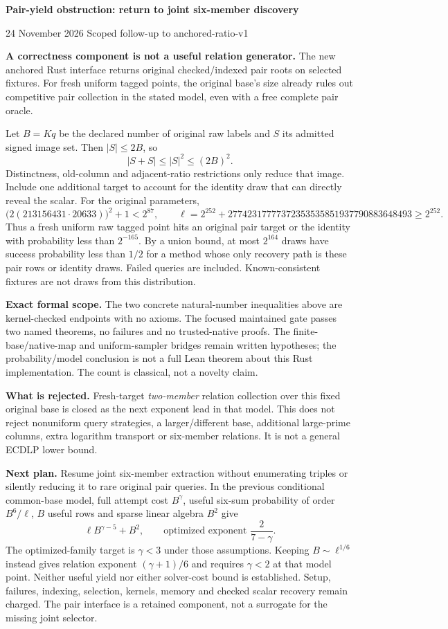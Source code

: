 \documentclass[11pt]{article}
\begin{document}
{\Large\bf Pair-yield obstruction: return to joint six-member discovery}\par
24 November 2026 \hfill Scoped follow-up to anchored-ratio-v1

\textbf{A correctness component is not a useful relation generator.}
The new anchored Rust interface returns original checked/indexed pair roots
on selected fixtures. For fresh uniform tagged points, the original base's
size already rules out competitive pair collection in the stated model,
even with a free complete pair oracle.

Let $B=Kq$ be the declared number of original raw labels and $S$ its admitted
signed image set. Then $|S|\le2B$, so
\[
 |S+S|\le |S|^2\le(2B)^2.
\]
Distinctness, old-column and adjacent-ratio restrictions only reduce that
image. Include one additional target to account for the identity draw that
can directly reveal the scalar. For the original parameters,
\[
 \bigl(2(213156431\cdot20633)\bigr)^2+1<2^{87},\qquad
 \ell=2^{252}+27742317777372353535851937790883648493\ge2^{252}.
\]
Thus a fresh uniform raw tagged point hits an original pair target or the
identity with probability less than $2^{-165}$. By a union bound, at most
$2^{164}$ draws have success probability less than $1/2$ for a method whose
only recovery path is these pair rows or identity draws. Failed queries are
included. Known-consistent fixtures are not draws from this distribution.

\textbf{Exact formal scope.} The two concrete natural-number inequalities
above are kernel-checked endpoints with no axioms. The focused maintained
gate passes two named theorems, no failures and no trusted-native proofs.
The finite-base/native-map and uniform-sampler bridges remain written
hypotheses; the probability/model conclusion is not a full Lean theorem
about this Rust implementation. The count is classical, not a novelty claim.

\textbf{What is rejected.} Fresh-target \emph{two-member} relation collection
over this fixed original base is closed as the next exponent lead in that
model. This does not reject nonuniform query strategies, a larger/different
base, additional large-prime columns, extra logarithm transport or six-member
relations. It is not a general ECDLP lower bound.

\textbf{Next plan.} Resume joint six-member extraction without enumerating
triples or silently reducing it to rare original pair queries. In the
previous conditional common-base model, full attempt cost $B^\gamma$, useful
six-sum probability of order $B^6/\ell$, $B$ useful rows and sparse linear
algebra $B^2$ give
\[
 \ell B^{\gamma-5}+B^2,\qquad
 \text{optimized exponent }\frac{2}{7-\gamma}.
\]
The optimized-family target is $\gamma<3$ under those assumptions. Keeping
$B\sim\ell^{1/6}$ instead gives relation exponent $(\gamma+1)/6$ and requires
$\gamma<2$ at that model point. Neither useful yield nor either solver-cost
bound is established. Setup, failures, indexing, selection, kernels, memory
and checked scalar recovery remain charged. The pair interface is a retained
component, not a surrogate for the missing joint selector.
\end{document}
